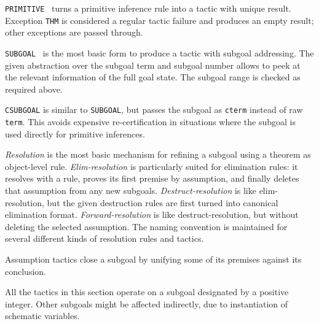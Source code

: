 \begin{isabellebody}
\begin{isamarkuptext}
\begin{description}
  \item \verb|PRIMITIVE|~ turns a primitive inference rule
  into a tactic with unique result.  Exception \verb|THM| is considered
  a regular tactic failure and produces an empty result; other
  exceptions are passed through.

  \item \verb|SUBGOAL|~ is the
  most basic form to produce a tactic with subgoal addressing.  The
  given abstraction over the subgoal term and subgoal number allows to
  peek at the relevant information of the full goal state.  The
  subgoal range is checked as required above.

  \item \verb|CSUBGOAL| is similar to \verb|SUBGOAL|, but passes the
  subgoal as \verb|cterm| instead of raw \verb|term|.  This
  avoids expensive re-certification in situations where the subgoal is
  used directly for primitive inferences.

  \end{description}%
\end{isamarkuptext}%
\isamarkuptrue%
%
\endisatagmlref
{\isafoldmlref}%
%
\isadelimmlref
%
\endisadelimmlref
%
\isamarkuptrue%
%
\begin{isamarkuptext}%
\emph{Resolution} is the most basic mechanism for refining a
  subgoal using a theorem as object-level rule.
  \emph{Elim-resolution} is particularly suited for elimination rules:
  it resolves with a rule, proves its first premise by assumption, and
  finally deletes that assumption from any new subgoals.
  \emph{Destruct-resolution} is like elim-resolution, but the given
  destruction rules are first turned into canonical elimination
  format.  \emph{Forward-resolution} is like destruct-resolution, but
  without deleting the selected assumption.  The 
  naming convention is maintained for several different kinds of
  resolution rules and tactics.

  Assumption tactics close a subgoal by unifying some of its premises
  against its conclusion.

  \medskip All the tactics in this section operate on a subgoal
  designated by a positive integer.  Other subgoals might be affected
  indirectly, due to instantiation of schematic variables.


\end{isamarkuptext}
\end{isabellebody}
